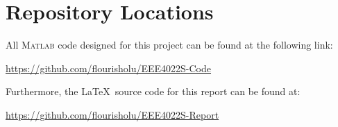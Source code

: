 \documentclass[class=report,11pt,crop=false]{standalone}
\begin{document}
\chapter{Repository Locations\label{sect:repositories}}
All \textsc{Matlab} code designed for this project can be found at the following link:

\begin{center}
    \url{https://github.com/flourisholu/EEE4022S-Code}
\end{center}

\vspace{1cm}

Furthermore, the \LaTeX~source code for this report can be found at:

\begin{center}
    \url{https://github.com/flourisholu/EEE4022S-Report}
\end{center}
\ifstandalone
% 
\fi
\end{document}
